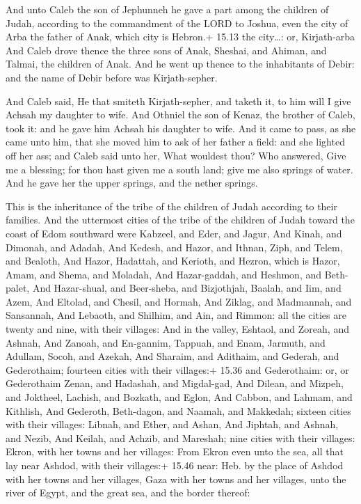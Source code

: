  And unto Caleb the son of Jephunneh he gave a part among
the children of Judah, according to the commandment of the LORD to
Joshua, even the city of Arba the father of Anak, which city is Hebron.+
15.13 the city\ldots: or, Kirjath-arba  And Caleb drove
thence the three sons of Anak, Sheshai, and Ahiman, and Talmai, the
children of Anak.  And he went up thence to the inhabitants
of Debir: and the name of Debir before was Kirjath-sepher.

 And Caleb said, He that smiteth Kirjath-sepher, and
taketh it, to him will I give Achsah my daughter to wife. 
And Othniel the son of Kenaz, the brother of Caleb, took it: and he gave
him Achsah his daughter to wife.  And it came to pass, as
she came unto him, that she moved him to ask of her father a field: and
she lighted off her ass; and Caleb said unto her, What wouldest thou?
 Who answered, Give me a blessing; for thou hast given me a
south land; give me also springs of water. And he gave her the upper
springs, and the nether springs.

 This is the inheritance of the tribe of the children of
Judah according to their families.  And the uttermost
cities of the tribe of the children of Judah toward the coast of Edom
southward were Kabzeel, and Eder, and Jagur,  And Kinah,
and Dimonah, and Adadah,  And Kedesh, and Hazor, and
Ithnan,  Ziph, and Telem, and Bealoth,  And
Hazor, Hadattah, and Kerioth, and Hezron, which is Hazor, 
Amam, and Shema, and Moladah,  And Hazar-gaddah, and
Heshmon, and Beth-palet,  And Hazar-shual, and Beer-sheba,
and Bizjothjah,  Baalah, and Iim, and Azem, 
And Eltolad, and Chesil, and Hormah,  And Ziklag, and
Madmannah, and Sansannah,  And Lebaoth, and Shilhim, and
Ain, and Rimmon: all the cities are twenty and nine, with their
villages:  And in the valley, Eshtaol, and Zoreah, and
Ashnah,  And Zanoah, and En-gannim, Tappuah, and Enam,
 Jarmuth, and Adullam, Socoh, and Azekah,  And
Sharaim, and Adithaim, and Gederah, and Gederothaim; fourteen cities
with their villages:+ 15.36 and Gederothaim: or, or Gederothaim
 Zenan, and Hadashah, and Migdal-gad,  And
Dilean, and Mizpeh, and Joktheel,  Lachish, and Bozkath,
and Eglon,  And Cabbon, and Lahmam, and Kithlish,
 And Gederoth, Beth-dagon, and Naamah, and Makkedah;
sixteen cities with their villages:  Libnah, and Ether, and
Ashan,  And Jiphtah, and Ashnah, and Nezib, 
And Keilah, and Achzib, and Mareshah; nine cities with their villages:
 Ekron, with her towns and her villages:  From
Ekron even unto the sea, all that lay near Ashdod, with their villages:+
15.46 near: Heb. by the place of  Ashdod with her towns and
her villages, Gaza with her towns and her villages, unto the river of
Egypt, and the great sea, and the border thereof:


